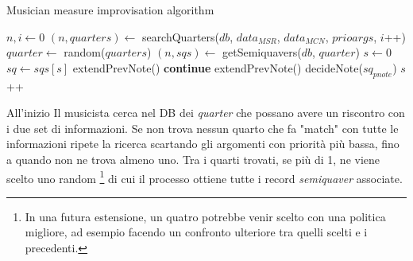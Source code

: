 \begin{algorithm}
\caption{Musician measure improvisation algorithm}
\label{algo-musician-measure}
\begin{algorithmic}[1]
 
	\State $n,i\gets0$
		\State $(n,quarters)\gets$ searchQuarters($db$, $data_{MSR}$, $data_{MCN}$, $prioargs$, $i$++)
	\EndWhile
	\State $quarter\gets$ random($quarters$)
	\State $(n,sqs)\gets$ getSemiquavers($db$, $quarter$)
	\State $s\gets0$
	 
		\State $sq\gets sqs[s]$
			\State extendPrevNote()
			\State \textbf{continue}
		\EndIf
			\State extendPrevNote()
		\Else
			\State decideNote($sq_{pnote}$)
		\EndIf
		\State $s$++
		
	\EndFor
\EndFor
\EndFunction
\end{algorithmic}
\end{algorithm}

All'inizio Il musicista cerca nel DB dei \emph{quarter} che possano
avere un riscontro con i due set di informazioni. Se non trova nessun
quarto che fa "match" con tutte le informazioni ripete la ricerca scartando
gli argomenti con priorità più bassa, fino a quando non ne trova almeno
uno. Tra i quarti trovati, se più di 1, ne viene scelto uno random
\footnote{In una futura estensione, un quatro potrebbe venir scelto con
una politica migliore, ad esempio facendo un confronto ulteriore tra quelli
scelti e i precedenti.} di cui il processo ottiene tutte i record
\emph{semiquaver} associate.


